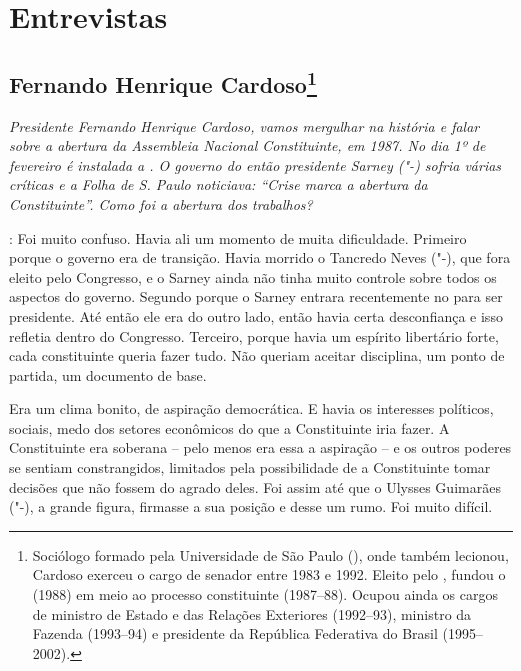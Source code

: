 \part{Entrevistas}

\chapter{Fernando Henrique Cardoso\footnote{Sociólogo formado pela Universidade de São Paulo (), onde também
lecionou, Cardoso exerceu o cargo de senador entre 1983 e 1992. Eleito
pelo , fundou o  (1988) em meio ao processo constituinte
(1987--88). Ocupou ainda os cargos de ministro de Estado e das Relações
Exteriores (1992--93), ministro da Fazenda (1993--94) e presidente da
República Federativa do Brasil (1995--2002).}}

\emph{ Presidente Fernando Henrique Cardoso, vamos mergulhar na
história e falar sobre a abertura da Assembleia Nacional Constituinte,
em 1987. No dia 1º de fevereiro é instalada a . O governo do então
presidente Sarney ("-) sofria várias críticas e a \emph{Folha de S. Paulo}
noticiava: ``Crise marca a abertura da Constituinte''. Como foi a abertura
dos trabalhos?}

\noindent{}: Foi muito confuso. Havia ali um
momento de muita dificuldade. Primeiro porque o governo era de
transição. Havia morrido o Tancredo Neves ("-), que fora eleito
pelo Congresso, e o Sarney ainda não tinha muito controle sobre todos os
aspectos do governo. Segundo porque o Sarney entrara recentemente no
 para ser presidente. Até então ele era do outro lado, então havia
certa desconfiança e isso refletia dentro do Congresso. Terceiro, porque
havia um espírito libertário forte, cada constituinte queria fazer tudo.
Não queriam aceitar disciplina, um ponto de partida, um documento de
base.

Era um clima bonito, de aspiração democrática. E havia os interesses
políticos, sociais, medo dos setores econômicos do que a Constituinte
iria fazer. A Constituinte era soberana -- pelo menos era essa a
aspiração -- e os outros poderes se sentiam constrangidos, limitados
pela possibilidade de a Constituinte tomar decisões que não fossem do
agrado deles. Foi assim até que o Ulysses Guimarães ("-), a grande
figura, firmasse a sua posição e desse um rumo. Foi muito difícil.

